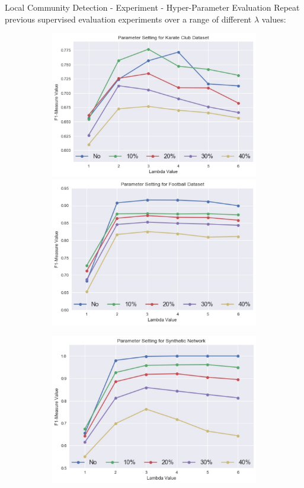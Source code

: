 \documentclass[9pt]{beamer}
\begin{document}
\begin{frame}{Local Community Detection - Experiment - Hyper-Parameter Evaluation}
\small
Repeat previous supervised evaluation experiments over a range of different $\lambda$ values:
\begin{figure}[h]
\begin{subfigure}[b]{\textwidth}
\includegraphics[scale = 0.12]{para1.jpeg}
\includegraphics[scale = 0.12]{para2.jpeg}
\centering
\end{subfigure}
\begin{subfigure}[b]{\textwidth}
\includegraphics[scale = 0.12]{para3.jpeg}

\end{subfigure}
\end{figure}
\end{frame}
\end{document}
